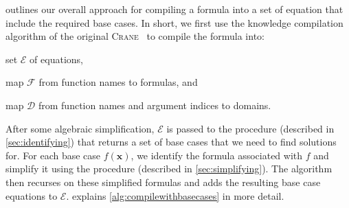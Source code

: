 \documentclass{article}
\theoremstyle{definition}
\theoremstyle{remark}
\begin{document}
 outlines our overall approach for compiling a
formula into a set of equation that include the required base cases. In short,
we first use the knowledge compilation algorithm of the original
\textsc{Crane}~\cite{DBLP:conf/kr/DilkasB23} to compile the formula into:
\begin{enumerate*}[label=(\roman*)]
  \item set $\mathcal{E}$ of equations,
  \item map $\mathcal{F}$ from function names to formulas, and
  \item map $\mathcal{D}$ from function names and argument indices to domains.
\end{enumerate*}
After some algebraic simplification, $\mathcal{E}$ is passed to the
\FindBaseCases procedure (described in \cref{sec:identifying}) that returns a
set of base cases that we need to find solutions for. For each base case
$f(\mathbf{x})$, we identify the formula associated with $f$ and simplify it
using the \Propagate procedure (described in \cref{sec:simplifying}). The
algorithm then recurses on these simplified formulas and adds the resulting base
case equations to $\mathcal{E}$.  explains
\cref{alg:compilewithbasecases} in more detail.
\end{document}
